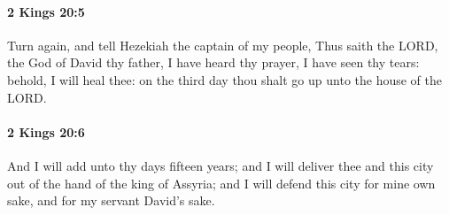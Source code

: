 		\paragraph{2 Kings 20:5} %
			\label{2KINGS-20-5}

			Turn again, and tell Hezekiah the captain of my people, Thus saith the LORD, the God of David thy father, I have heard thy prayer, I have seen thy tears: behold, I will heal thee: on the third day thou shalt go up unto the house of the LORD.


		\paragraph{2 Kings 20:6} %
			\label{2KINGS-20-6}

			And I will add unto thy days fifteen years; and I will deliver thee and this city out of the hand of the king of Assyria; and I will defend this city for mine own sake, and for my servant David’s sake.

